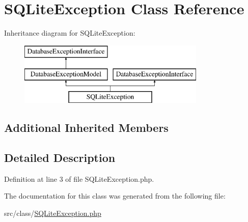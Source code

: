 \hypertarget{class_s_q_lite_exception}{}\section{S\+Q\+Lite\+Exception Class Reference}
\label{class_s_q_lite_exception}
Inheritance diagram for S\+Q\+Lite\+Exception\+:\begin{figure}[H]
\begin{center}
\leavevmode
\includegraphics[height=3.000000cm]{class_s_q_lite_exception}
\end{center}
\end{figure}
\subsection*{Additional Inherited Members}


\subsection{Detailed Description}


Definition at line 3 of file S\+Q\+Lite\+Exception.\+php.



The documentation for this class was generated from the following file\+:\begin{DoxyCompactItemize}
\item 
src/class/\hyperlink{_s_q_lite_exception_8php}{S\+Q\+Lite\+Exception.\+php}\end{DoxyCompactItemize}
